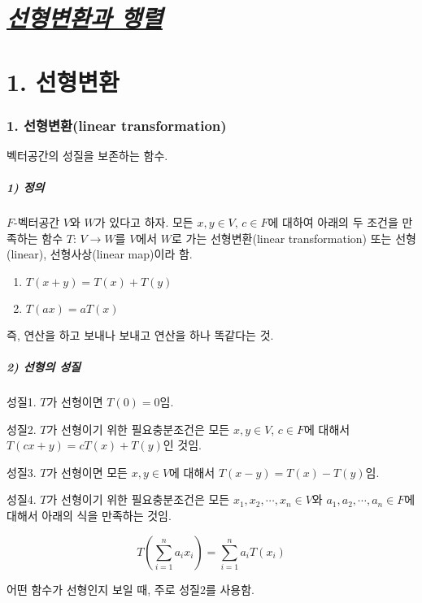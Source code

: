 \part{\textit{\underline{선형변환과 행렬}}}
\part*{1. 선형변환}

\section*{1. 선형변환(linear transformation)}

벡터공간의 성질을 보존하는 함수.

\subsubsection*{1) 정의\\}
\begin{DEF}
$F$-벡터공간 $V$와 $W$가 있다고 하자. 모든 $x,y \in V,\,c \in F$에 대하여 아래의 두 조건을 만족하는 함수 $T:\,V \rightarrow W$를 $V$에서 $W$로 가는 선형변환(linear transformation) 또는 선형(linear), 선형사상(linear map)이라 함.

\begin{enumerate}
\item $T(x+y)=T(x)+T(y)$
\item $T(ax)=aT(x)$
\end{enumerate}
\end{DEF}

즉, 연산을 하고 보내나 보내고 연산을 하나 똑같다는 것.

\subsubsection*{2) 선형의 성질}
성질1. $T$가 선형이면 $T(0)=0$임.

성질2. $T$가 선형이기 위한 필요충분조건은 모든 $x,y \in V$, $c \in F$에 대해서 $T(cx+y)=cT(x)+T(y)$인 것임.

성질3. $T$가 선형이면 모든 $x,y \in V$에 대해서 $T(x-y)=T(x)-T(y)$임.

성질4. $T$가 선형이기 위한 필요충분조건은 모든 $x_1,x_2, \cdots ,x_n \in V$와 $a_1,a_2, \cdots ,a_n \in F$에 대해서 아래의 식을 만족하는 것임.

\[
T(\sum_{i=1}^{n}{a_i x_i})=\sum_{i=1}^{n}{a_i T(x_i)}
\]

어떤 함수가 선형인지 보일 때, 주로 성질2를 사용함.

